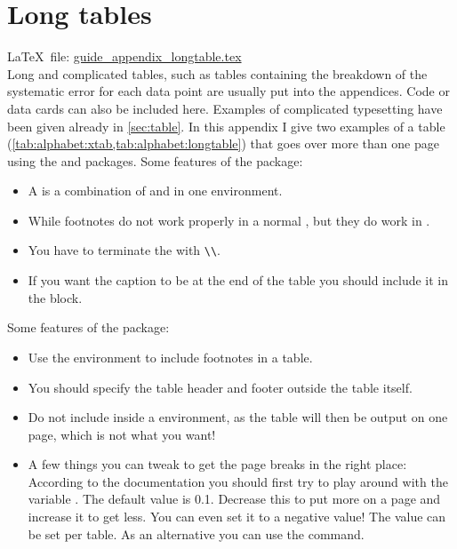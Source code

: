 
\chapter{Long tables}%
\label{sec:app:tables}

\LaTeX\ file: \href{run:./guide_appendix_longtable.tex}{guide\_appendix\_longtable.tex}\\[1ex]
\noindent
Long and complicated tables, such as tables containing the breakdown
of the systematic error for each data point are usually put into the
appendices. Code or data cards can also be included here.
Examples of complicated typesetting have been given already in \cref{sec:table}.
In this appendix I give two examples of a table
(\cref{tab:alphabet:xtab,tab:alphabet:longtable}) that goes over more than one page
using the  and  packages.
Some features of the  package:
\begin{itemize}\setlength{\parskip}{0pt}
  \item A  is a combination of  and  in one environment. 
  \item While footnotes do not work properly in a normal ,
    but they do work in .
  \item You have to terminate the  with \verb|\\|.
  \item If you want the caption to be at the end of the table you should include 
    it in the  block.
\end{itemize}

Some features of the  package:
\begin{itemize}\setlength{\parskip}{0pt}
  \item Use the  environment to include footnotes in a table.
  \item You should specify the table header and footer outside the table itself.
  \item Do not include  inside a  environment, as the table will
    then be output on one page, which is not what you want!
  \item A few things you can tweak to get the page breaks in the right place:
    According to the  documentation you should first try to play
    around with the variable . The default value is \num{0.1}.
    Decrease this to put more on a page and increase it to get less.
    You can even set it to a negative value!
    The value can be set per table.
    As an alternative you can use the  command.
\end{itemize}

